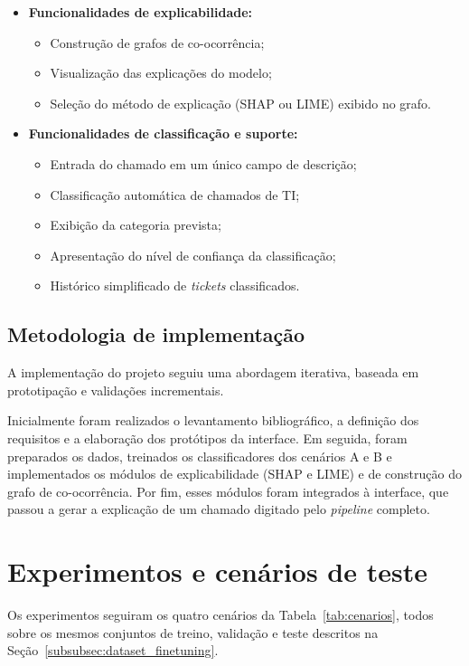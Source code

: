 \documentclass[
    12pt,                %
    openright,           %
    oneside,             %
    a4paper,             %
    english,             %
    brazil               %
]{abntex2}
\begin{document}
\begin{itemize}
    \item \textbf{Funcionalidades de explicabilidade:}
    \begin{itemize}
        \item Construção de grafos de co-ocorrência;
        \item Visualização das explicações do modelo;
        \item Seleção do método de explicação (SHAP ou LIME) exibido no grafo.
    \end{itemize}
    \item \textbf{Funcionalidades de classificação e suporte:}
    \begin{itemize}
        \item Entrada do chamado em um único campo de descrição;
        \item Classificação automática de chamados de TI;
        \item Exibição da categoria prevista;
        \item Apresentação do nível de confiança da classificação;
        \item Histórico simplificado de \textit{tickets} classificados.
    \end{itemize}
\end{itemize}

\subsection{Metodologia de implementação}

A implementação do projeto seguiu uma abordagem iterativa, baseada em 
prototipação e validações incrementais.

Inicialmente foram realizados o levantamento bibliográfico, a 
definição dos requisitos e a elaboração dos protótipos da interface. 
Em seguida, foram preparados os dados, treinados os classificadores 
dos cenários A e B e implementados os módulos de explicabilidade 
(SHAP e LIME) e de construção do grafo de co-ocorrência. Por fim, 
esses módulos foram integrados à interface, que passou a gerar a 
explicação de um chamado digitado pelo \textit{pipeline} completo.


\section{Experimentos e cenários de teste}

Os experimentos seguiram os quatro cenários da Tabela~\ref{tab:cenarios}, todos sobre os mesmos conjuntos de treino, validação e teste descritos na Seção~\ref{subsubsec:dataset_finetuning}.
\end{document}
